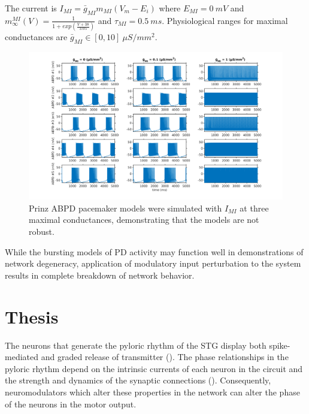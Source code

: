 \documentclass[14pt]{article}
\begin{document}
	The current is $I_{MI} = \bar{g}_{MI} m_{MI} (V_m - E_i)$ where $E_{MI} = 0~mV$ and $m^{MI}_\infty(V) = \frac{1}{1 + exp(\frac{V + 38}{3.05})}$ and $\tau_{MI} = 0.5~ms$. Physiological ranges for maximal conductances are $\bar{g}_{MI} \in [0,10]~\mu S/mm^2$.
	\begin{figure}
		\centering
		\includegraphics[width=0.8\textheight]{PrinzABPDwithMI}
		\caption{Prinz ABPD pacemaker models were simulated with $I_{MI}$ at three maximal conductances, demonstrating that the models are not robust.}
	\end{figure}
	While the bursting models of PD activity may function well in demonstrations of network degeneracy, application of modulatory input perturbation to the system results in complete breakdown of network behavior.
	
	\section{Thesis}
	The neurons that generate the pyloric rhythm of the STG display both spike-mediated and graded release of transmitter (\cite{ThirumalaiRedPigmentConcentrating2006,RaperNonimpulsemediatedsynaptictransmission1979}). The phase relationships in the pyloric rhythm depend on the intrinsic currents of each neuron in the circuit and the strength and dynamics of the synaptic connections (\cite{EisenMechanismsunderlyingpattern1982,Harris-WarrickDynamicBiologicalNetworks1992,HartlinePatterngenerationlobster1979,MarderUnderstandingCircuitDynamics2007}). Consequently, neuromodulators which alter these properties in the network can alter the phase of the neurons in the motor output.
	
\end{document}
